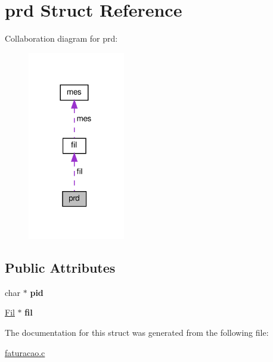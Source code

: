 \hypertarget{structprd}{}\section{prd Struct Reference}
\label{structprd}


Collaboration diagram for prd\+:
\nopagebreak
\begin{figure}[H]
\begin{center}
\leavevmode
\includegraphics[width=120pt]{structprd__coll__graph}
\end{center}
\end{figure}
\subsection*{Public Attributes}
\begin{DoxyCompactItemize}
\item 
\mbox{\label{structprd_ab263af87d7d5939e74048142eef82bba}} 
char $\ast$ {\bfseries pid}
\item 
\mbox{\label{structprd_a0f71e040e3697d8283952ae3a0cd7f81}} 
\hyperlink{structfil}{Fil} $\ast$ {\bfseries fil}
\end{DoxyCompactItemize}


The documentation for this struct was generated from the following file\+:\begin{DoxyCompactItemize}
\item 
\hyperlink{faturacao_8c}{faturacao.\+c}\end{DoxyCompactItemize}
